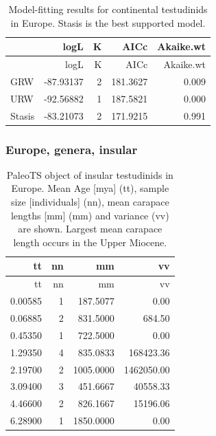 \begin{longtable}[]{@{}lrrrr@{}}
	\caption[Model fits for continental \T in Europe]{Model-fitting results for continental testudinids in Europe. Stasis is the best supported model.}
	\label{tab:pTSEuCEM}\tabularnewline
	\toprule
	& logL & K & AICc & Akaike.wt\tabularnewline
	\midrule
	\endfirsthead
	\toprule
	& logL & K & AICc & Akaike.wt\tabularnewline
	\midrule
	\endhead
	GRW & -87.93137 & 2 & 181.3627 & 0.009\tabularnewline
	URW & -92.56882 & 1 & 187.5821 & 0.000\tabularnewline
	Stasis & -83.21073 & 2 & 171.9215 & 0.991\tabularnewline
	\bottomrule
\end{longtable}


\FloatBarrier



\subsubsection*{Europe, genera,
	insular}\label{europe-genera-insular}

\begin{longtable}[]{@{}rrrr@{}}
	\caption[PaleoTS object of insular \T in Europe]{PaleoTS object of insular testudinids in Europe. Mean Age [mya] (tt), sample size [individuals] (nn), mean carapace lengths [mm] (mm) and variance (vv) are shown. Largest mean carapace length occurs in the Upper Miocene.}
	\label{tab:pTSEuI}\tabularnewline
	\toprule
	tt & nn & mm & vv\tabularnewline
	\midrule
	\endfirsthead
	\toprule
	tt & nn & mm & vv\tabularnewline
	\midrule
	\endhead
	0.00585 & 1 & 187.5077 & 0.00\tabularnewline
	0.06885 & 2 & 831.5000 & 684.50\tabularnewline
	0.45350 & 1 & 722.5000 & 0.00\tabularnewline
	1.29350 & 4 & 835.0833 & 168423.36\tabularnewline
	2.19700 & 2 & 1005.0000 & 1462050.00\tabularnewline
	3.09400 & 3 & 451.6667 & 40558.33\tabularnewline
	4.46600 & 2 & 826.1667 & 15196.06\tabularnewline
	6.28900 & 1 & 1850.0000 & 0.00\tabularnewline
	\bottomrule
\end{longtable}

